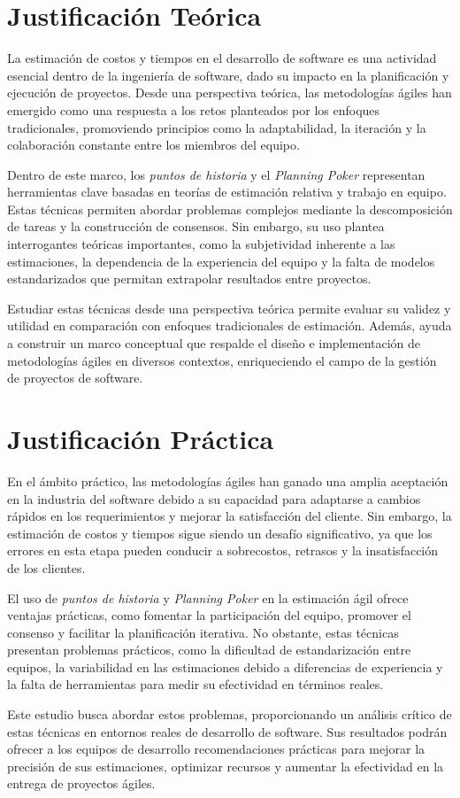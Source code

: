 \section{Justificación Teórica}

La estimación de costos y tiempos en el desarrollo de software es una actividad esencial dentro de la ingeniería de software, dado su impacto en la planificación y ejecución de proyectos. Desde una perspectiva teórica, las metodologías ágiles han emergido como una respuesta a los retos planteados por los enfoques tradicionales, promoviendo principios como la adaptabilidad, la iteración y la colaboración constante entre los miembros del equipo.

Dentro de este marco, los \textit{puntos de historia} y el \textit{Planning Poker} representan herramientas clave basadas en teorías de estimación relativa y trabajo en equipo. Estas técnicas permiten abordar problemas complejos mediante la descomposición de tareas y la construcción de consensos. Sin embargo, su uso plantea interrogantes teóricas importantes, como la subjetividad inherente a las estimaciones, la dependencia de la experiencia del equipo y la falta de modelos estandarizados que permitan extrapolar resultados entre proyectos.

Estudiar estas técnicas desde una perspectiva teórica permite evaluar su validez y utilidad en comparación con enfoques tradicionales de estimación. Además, ayuda a construir un marco conceptual que respalde el diseño e implementación de metodologías ágiles en diversos contextos, enriqueciendo el campo de la gestión de proyectos de software.

\section{Justificación Práctica}

En el ámbito práctico, las metodologías ágiles han ganado una amplia aceptación en la industria del software debido a su capacidad para adaptarse a cambios rápidos en los requerimientos y mejorar la satisfacción del cliente. Sin embargo, la estimación de costos y tiempos sigue siendo un desafío significativo, ya que los errores en esta etapa pueden conducir a sobrecostos, retrasos y la insatisfacción de los clientes.

El uso de \textit{puntos de historia} y \textit{Planning Poker} en la estimación ágil ofrece ventajas prácticas, como fomentar la participación del equipo, promover el consenso y facilitar la planificación iterativa. No obstante, estas técnicas presentan problemas prácticos, como la dificultad de estandarización entre equipos, la variabilidad en las estimaciones debido a diferencias de experiencia y la falta de herramientas para medir su efectividad en términos reales.

Este estudio busca abordar estos problemas, proporcionando un análisis crítico de estas técnicas en entornos reales de desarrollo de software. Sus resultados podrán ofrecer a los equipos de desarrollo recomendaciones prácticas para mejorar la precisión de sus estimaciones, optimizar recursos y aumentar la efectividad en la entrega de proyectos ágiles.

